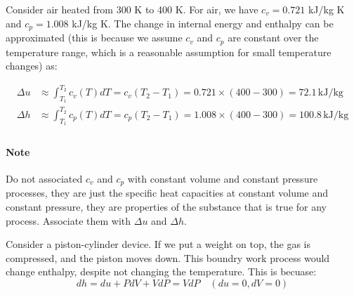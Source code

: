 \documentclass[11pt]{report}
\begin{document}
\begin{example}
    Consider air heated from 300 K to 400 K. For air, we have $c_v = 0.721$ kJ/kg K and $c_p = 1.008$ kJ/kg K. The change in internal energy and enthalpy can be approximated (this is because we assume $c_v$ and $c_p$ are constant over the temperature range, which is a reasonable assumption for small temperature changes) as:

    \begin{align*}
        \Delta u &\approx \int_{T_1}^{T_2} c_v(T) dT = c_v (T_2 - T_1) = 0.721 \times (400 - 300) = 72.1\, \text{kJ/kg} \\
        \Delta h &\approx \int_{T_1}^{T_2} c_p(T) dT = c_p (T_2 - T_1) = 1.008 \times (400 - 300) = 100.8\, \text{kJ/kg} \\
    \end{align*}
\end{example}

\paragraph{Note} Do not associated $c_v$ and $c_p$ with constant volume and constant pressure processes, they are just the specific heat capacities at constant volume and constant pressure, they are properties of the substance that is true for any process. Associate them with $\Delta u$ and $\Delta h$.

\begin{example}
    Consider a piston-cylinder device. If we put a weight on top, the gas is compressed, and the piston moves down. This boundry work process would change enthalpy, despite not changing the temperature. This is becuase:
    $$
        dh = du + PdV + VdP = VdP \quad (du = 0, dV = 0)
    $$
\end{example}
\end{document}

